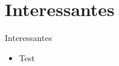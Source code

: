 \section{Interessantes}
\begin{frame}{Interessantes}
	\begin{itemize}
		\item  Test
	\end{itemize}

	
\end{frame}
